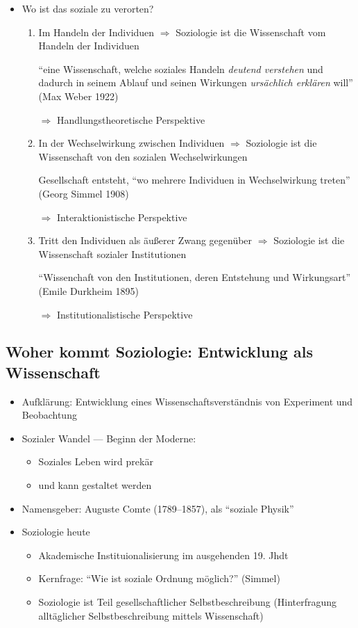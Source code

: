 \documentclass[a4paper, 12pt]{scrartcl}
\begin{document}
\begin{itemize}
	\item
		Wo ist das soziale zu verorten?
\begin{enumerate}
	\item
		Im Handeln der Individuen $\Rightarrow$ Soziologie ist die Wissenschaft vom Handeln der Individuen

		\enquote{eine Wissenschaft, welche soziales Handeln \textit{deutend verstehen} und dadurch in seinem Ablauf und seinen Wirkungen \textit{ursächlich erklären} will} (Max Weber 1922)

		$\Rightarrow$
		Handlungstheoretische Perspektive
	\item
		In der Wechselwirkung zwischen Individuen $\Rightarrow$ Soziologie ist die Wissenschaft von den sozialen Wechselwirkungen

		Gesellschaft entsteht, \enquote{wo mehrere Individuen in Wechselwirkung treten} (Georg Simmel 1908)

		$\Rightarrow$
		Interaktionistische Perspektive

	\item
		Tritt den Individuen als äußerer Zwang gegenüber $\Rightarrow$ Soziologie ist die Wissenschaft sozialer Institutionen

		\enquote{Wissenchaft von den Institutionen, deren Entstehung und Wirkungsart} (Emile Durkheim 1895)

		$\Rightarrow$
		Institutionalistische Perspektive

\end{enumerate}
\end{itemize}

\subsection{Woher kommt Soziologie: Entwicklung als Wissenschaft}
\begin{itemize}
	\item
		Aufklärung: Entwicklung eines Wissenschaftsverständnis von Experiment und Beobachtung
	\item
		Sozialer Wandel --- Beginn der Moderne:
		\begin{itemize}
			\item
				Soziales Leben wird prekär
			\item
				und kann gestaltet werden
		\end{itemize}
	\item
		Namensgeber: Auguste Comte (1789--1857), als \enquote{soziale Physik}
	\item
		Soziologie heute
		\begin{itemize}
			\item
				Akademische Instituionalisierung im ausgehenden 19. Jhdt
			\item
				Kernfrage: \enquote{Wie ist soziale Ordnung möglich?} (Simmel)
			\item
				Soziologie ist Teil gesellschaftlicher Selbstbeschreibung (Hinterfragung alltäglicher Selbstbeschreibung mittels Wissenschaft)
		\end{itemize}
\end{itemize}
\end{document}
